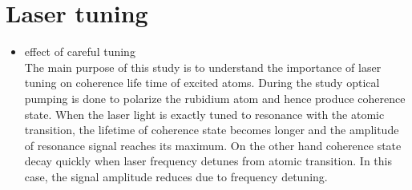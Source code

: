   \section{Laser tuning} 
   \begin{itemize}
   \item effect of careful tuning\\
	The main purpose of this study is to understand the importance of laser tuning on coherence life time of excited atoms. During the study optical pumping is done to polarize the rubidium atom and hence produce coherence state. When the laser light  is  exactly tuned to resonance with the atomic transition, the lifetime of coherence state becomes longer and the amplitude of resonance signal reaches its maximum. On the other hand coherence state decay  quickly when laser frequency detunes from atomic transition. In this case, the signal amplitude reduces due to frequency detuning.
	 \begin{figure}
    \centering
 

\end{figure}
\end{itemize}
